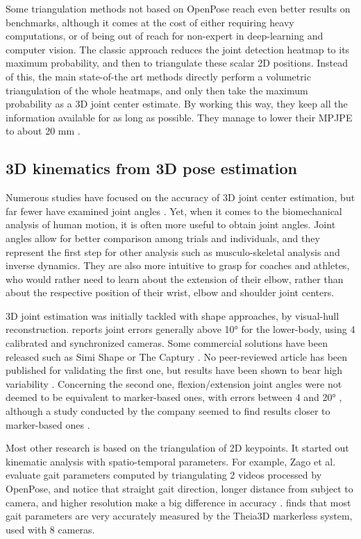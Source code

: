 Some triangulation methods not based on OpenPose reach even better results on benchmarks, although it comes at the cost of either requiring heavy computations, or of being out of reach for non-expert in deep-learning and computer vision. The classic approach reduces the joint detection heatmap to its maximum probability, and then to triangulate these scalar 2D positions. Instead of this, the main state-of-the art methods directly perform a volumetric triangulation of the whole heatmaps, and only then take the maximum probability as a 3D joint center estimate. By working this way, they keep all the information available for as long as possible. They manage to lower their MPJPE to about 20 mm \cite{He2020,Iskakov2019}. 


\subsection{3D kinematics from 3D pose estimation}

Numerous studies have focused on the accuracy of 3D joint center estimation, but far fewer have examined joint angles \cite{Zheng2022}. Yet, when it comes to the biomechanical analysis of human motion, it is often more useful to obtain joint angles. Joint angles allow for better comparison among trials and individuals, and they represent the first step for other analysis such as musculo-skeletal analysis and inverse dynamics. They are also more intuitive to grasp for coaches and athletes, who would rather need to learn about the extension of their elbow, rather than about the respective position of their wrist, elbow and shoulder joint centers. 

3D joint estimation was initially tackled with shape approaches, by visual-hull reconstruction. \cite{Ceseracciu2014} reports joint errors generally above 10° for the lower-body, using 4 calibrated and synchronized cameras. Some commercial solutions have been released such as Simi Shape \cite{SimiShape} or The Captury \cite{Captury}. No peer-reviewed article has been published for validating the first one, but results have been shown to bear high variability \cite{Becker2015}. Concerning the second one, flexion/extension joint angles were not deemed to be equivalent to marker-based ones, with errors between 4 and 20° \cite{Harsted2019}, although a study conducted by the company seemed to find results closer to marker-based ones \cite{Fleisig2022}. 

Most other research is based on the triangulation of 2D keypoints. It started out kinematic analysis with spatio-temporal parameters. For example, Zago et al. evaluate gait parameters computed by triangulating 2 videos processed by OpenPose, and notice that straight gait direction, longer distance from subject to camera, and higher resolution make a big difference in accuracy \cite{Zago2020}. \cite{Kanko2021c} finds that most gait parameters are very accurately measured by the Theia3D markerless system, used with 8 cameras.

